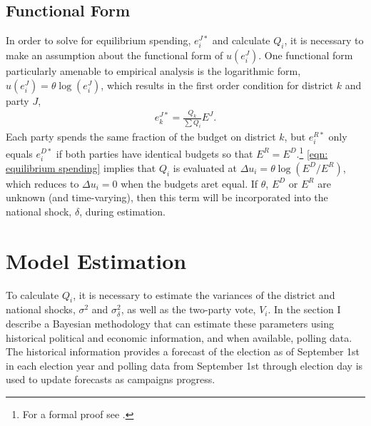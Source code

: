 \documentclass[12pt,final,fleqn]{article}
\theoremstyle{plain}
\begin{document}
\subsection{Functional Form} \label{sec: functional form}
In order to solve for equilibrium spending, $e_i^{J*}$ and calculate $Q_i$, it is necessary to make an assumption about the functional form of $u(e_i^J)$. One functional form particularly amenable to empirical analysis is the logarithmic form, $u(e_i^J)= \theta \log (e_i^J)$, which results in the first order condition for district $k$ and party $J$,
\begin{align} \label{eqn: equilibrium spending}
e_k^{J*} = \frac{Q_k}{\sum Q_i}E^{J}.
\end{align} 
Each party spends the same fraction of the budget on district $k$, but $e_i^{R*}$ only equals $e_i^{D*}$ if both parties have identical budgets so that $E^{R} = E^{D}$.\footnote{For a formal proof see \citet{stromberg2008electoral}.} \autoref{eqn: equilibrium spending} implies that $Q_i$ is evaluated at $\Delta u_i = \theta \log(E^D/E^R)$, which reduces to $\Delta u_i=0$ when the budgets aret equal. If $\theta$, $E^D$ or $E^R$ are unknown (and time-varying), then this term will be incorporated into the national shock, $\delta$, during estimation.

\section{Model Estimation}
To calculate $Q_i$, it is necessary to estimate the variances of the district and national shocks, $\sigma^2$ and $\sigma^2_\delta$, as well as the two-party vote, $V_i$. In the section I describe a Bayesian methodology that can estimate these parameters using historical political and economic information, and when available, polling data. The historical information provides a forecast of the election as of September 1st in each election year and polling data from September 1st through election day is used to update forecasts as campaigns progress. 
\end{document}
